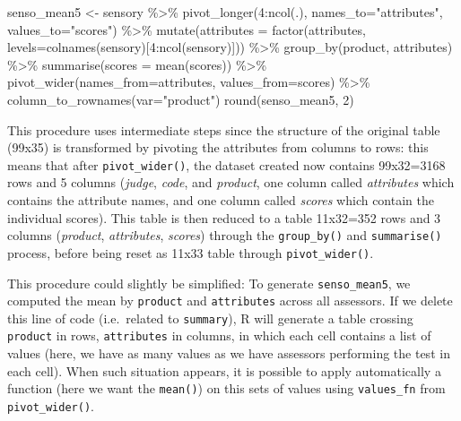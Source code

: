 \documentclass[
]{book}
\newenvironment{Shaded}{\begin{snugshade}}{\end{snugshade}}
\newcommand{\AttributeTok}[1]{\textcolor[rgb]{0.77,0.63,0.00}{#1}}
\newcommand{\DecValTok}[1]{\textcolor[rgb]{0.00,0.00,0.81}{#1}}
\newcommand{\FunctionTok}[1]{\textcolor[rgb]{0.00,0.00,0.00}{#1}}
\newcommand{\NormalTok}[1]{#1}
\newcommand{\OtherTok}[1]{\textcolor[rgb]{0.56,0.35,0.01}{#1}}
\newcommand{\SpecialCharTok}[1]{\textcolor[rgb]{0.00,0.00,0.00}{#1}}
\newcommand{\StringTok}[1]{\textcolor[rgb]{0.31,0.60,0.02}{#1}}
\begin{document}
\begin{Shaded}
\begin{Highlighting}[]
\NormalTok{senso\_mean5 }\OtherTok{\textless{}{-}}\NormalTok{ sensory }\SpecialCharTok{\%\textgreater{}\%} 
  \FunctionTok{pivot\_longer}\NormalTok{(}\DecValTok{4}\SpecialCharTok{:}\FunctionTok{ncol}\NormalTok{(.), }\AttributeTok{names\_to=}\StringTok{"attributes"}\NormalTok{, }\AttributeTok{values\_to=}\StringTok{"scores"}\NormalTok{) }\SpecialCharTok{\%\textgreater{}\%} 
  \FunctionTok{mutate}\NormalTok{(}\AttributeTok{attributes =} \FunctionTok{factor}\NormalTok{(attributes, }\AttributeTok{levels=}\FunctionTok{colnames}\NormalTok{(sensory)[}\DecValTok{4}\SpecialCharTok{:}\FunctionTok{ncol}\NormalTok{(sensory)])) }\SpecialCharTok{\%\textgreater{}\%} 
  \FunctionTok{group\_by}\NormalTok{(product, attributes) }\SpecialCharTok{\%\textgreater{}\%} 
  \FunctionTok{summarise}\NormalTok{(}\AttributeTok{scores =} \FunctionTok{mean}\NormalTok{(scores)) }\SpecialCharTok{\%\textgreater{}\%} 
  \FunctionTok{pivot\_wider}\NormalTok{(}\AttributeTok{names\_from=}\NormalTok{attributes, }\AttributeTok{values\_from=}\NormalTok{scores) }\SpecialCharTok{\%\textgreater{}\%} 
  \FunctionTok{column\_to\_rownames}\NormalTok{(}\AttributeTok{var=}\StringTok{"product"}\NormalTok{)}
\FunctionTok{round}\NormalTok{(senso\_mean5, }\DecValTok{2}\NormalTok{)}
\end{Highlighting}
\end{Shaded}

This procedure uses intermediate steps since the structure of the original table (99x35) is transformed by pivoting the attributes from columns to rows: this means that after \texttt{pivot\_wider()}, the dataset created now contains 99x32=3168 rows and 5 columns (\emph{judge}, \emph{code}, and \emph{product}, one column called \emph{attributes} which contains the attribute names, and one column called \emph{scores} which contain the individual scores). This table is then reduced to a table 11x32=352 rows and 3 columns (\emph{product}, \emph{attributes}, \emph{scores}) through the \texttt{group\_by()} and \texttt{summarise()} process, before being reset as 11x33 table through \texttt{pivot\_wider()}.

This procedure could slightly be simplified: To generate \texttt{senso\_mean5}, we computed the mean by \texttt{product} and \texttt{attributes} across all assessors. If we delete this line of code (i.e.~related to \texttt{summary}), R will generate a table crossing \texttt{product} in rows, \texttt{attributes} in columns, in which each cell contains a list of values (here, we have as many values as we have assessors performing the test in each cell).
When such situation appears, it is possible to apply automatically a function (here we want the \texttt{mean()}) on this sets of values using \texttt{values\_fn} from \texttt{pivot\_wider()}.
\end{document}
